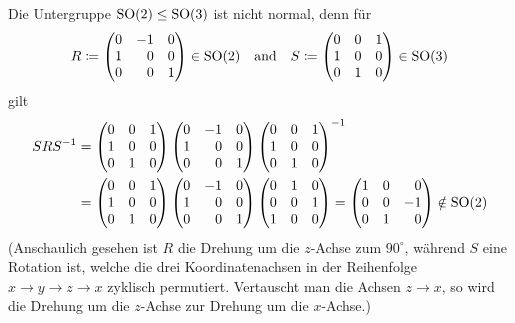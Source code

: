 Die Untergruppe $\operatorname{SO}(2) \leq \operatorname{SO}(3)$ ist nicht normal, denn für
\[
            R
  \coloneqq \begin{pmatrix*}[r]
              0 & -1  & 0 \\
              1 &  0  & 0 \\
              0 &  0  & 1
            \end{pmatrix*}
  \in       \sorthogonal{2}
  \quad\text{and}\quad
            S
  \coloneqq \begin{pmatrix}
              0 & 0 & 1 \\
              1 & 0 & 0 \\
              0 & 1 & 0
            \end{pmatrix}
  \in       \sorthogonal{3}
\]
gilt
\begin{align*}
          S R S^{-1}
  &=      \begin{pmatrix}
            0 & 0 & 1 \\
            1 & 0 & 0 \\
            0 & 1 & 0
          \end{pmatrix}
          \begin{pmatrix*}[r]
            0 & -1  & 0 \\
            1 &  0  & 0 \\
            0 &  0  & 1
          \end{pmatrix*}
          \begin{pmatrix}
            0 & 0 & 1 \\
            1 & 0 & 0 \\
            0 & 1 & 0
          \end{pmatrix}^{-1}
  \\
  &=      \begin{pmatrix}
            0 & 0 & 1 \\
            1 & 0 & 0 \\
            0 & 1 & 0
          \end{pmatrix}
          \begin{pmatrix*}[r]
            0 & -1  & 0 \\
            1 &  0  & 0 \\
            0 &  0  & 1
          \end{pmatrix*}
          \begin{pmatrix}
            0 & 1 & 0 \\
            0 & 0 & 1 \\
            1 & 0 & 0
          \end{pmatrix}
   =      \begin{pmatrix*}[r]
            1 & 0 &  0  \\
            0 & 0 & -1  \\
            0 & 1 &  0
          \end{pmatrix*}
   \notin \sorthogonal{2}
\end{align*}
(Anschaulich gesehen ist $R$ die Drehung um die $z$-Achse zum $90^\circ$, während $S$ eine Rotation ist, welche die drei Koordinatenachsen in der Reihenfolge $x \to y \to z \to x$ zyklisch permutiert.
Vertauscht man die Achsen $z \to x$, so wird die Drehung um die $z$-Achse zur Drehung um die $x$-Achse.)

